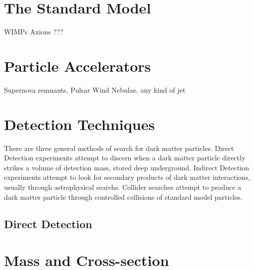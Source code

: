 
\section{The Standard Model}

WIMPs
Axions
???

\section{Particle Accelerators}

Supernova remnants, Pulsar Wind Nebulae, any kind of jet


\section{Detection Techniques}

There are three general methods of search for dark matter particles.
Direct Detection experiments attempt to discern when a dark matter particle directly strikes a volume of detection mass, stored deep underground.
Indirect Detection experiments attempt to look for secondary products of dark matter interactions, usually through astrophysical searchs.
Collider searches attempt to produce a dark matter particle through controlled collisions of standard model particles.

\subsection{Direct Detection}




\section{Mass and Cross-section}


